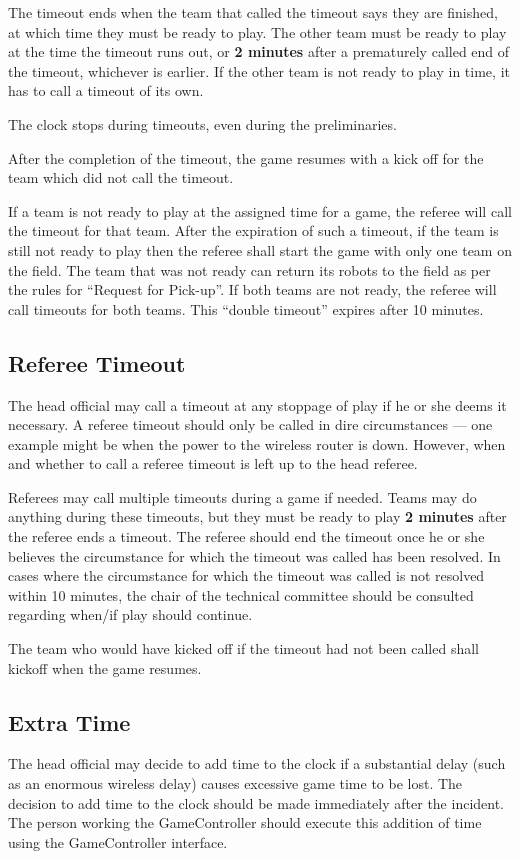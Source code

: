 \documentclass[12pt]{article}
\begin{document}
The timeout ends when the team that called the timeout says they are finished, at which time they must be ready to play. The other team must be ready to play at the time the timeout runs out, or \textbf{2 minutes} after a prematurely called end of the timeout, whichever is earlier. If the other team is not ready to play in time, it has to call a timeout of its own.
  
The clock stops during timeouts, even during the preliminaries.

After the completion of the timeout, the game resumes with a kick off for the team which did not call the timeout.

If a team is not ready to play at the assigned time for a game, the referee will call the timeout for that team. After the expiration of such a timeout, if the team is still not ready to play then the referee shall start the game with only one team on the field.  The team that was not ready can return its robots to the field as per the rules for ``Request for Pick-up''. If both teams are not ready, the referee will call timeouts for both teams. This ``double timeout'' expires after 10 minutes.

\subsection{Referee Timeout}
\label{sec:referee_timeout}
The head official may call a timeout at any stoppage of play if he or she deems it necessary.  A referee timeout should only be called in dire circumstances --- one example might be when the power to the wireless router is down.  However, when and whether to call a referee timeout is left up to the head referee.

Referees may call multiple timeouts during a game if needed.  Teams may do anything during these timeouts, but they must be ready to play \textbf{2 minutes} after the referee ends a timeout.  The referee should end the timeout once he or she believes the circumstance for which the timeout was called has been resolved.  In cases where the circumstance for which the timeout was called is not resolved within 10 minutes, the chair of the technical committee should be consulted regarding when/if play should continue.

The team who would have kicked off if the timeout had not been called shall kickoff when the game resumes.

\subsection{Extra Time}
\label{sec:extra_time}
The head official may decide to add time to the clock if a substantial delay (such as an enormous wireless delay) causes excessive game time to be lost.  The decision to add time to the clock should be made immediately after the incident.  The person working the GameController should execute this addition of time using the GameController interface.
\end{document}
